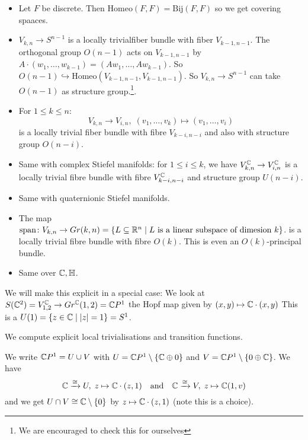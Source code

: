 \documentclass[language=english]{TemplateLecture}
\begin{document}
\begin{example}
    \begin{itemize}
        \item Let \(F\) be discrete. Then \(\mathrm{Homeo}(F,F) = \mathrm{Bij}(F,F)\) so we get covering spaaces.
        \item \(V_{k,n} \to S^{n-1}\) is a locally trivialfiber bundle with fiber \(V_{k-1,n-1}\). The orthogonal group \(O(n-1)\) acts on \(V_{k-1, n-1}\) by \(A \cdot (w_1, \dots, w_{k-1}) = (A w_1, \dots, Aw_{k-1})\). So \(O(n-1) \hookrightarrow \mathrm{Homeo}(V_{k-1,n-1}, V_{k-1, n-1})\). So \(V_{k,n} \to S^{n-1}\) can take \(O(n-1)\) as structure group.\footnote{We are encouraged to check this for ourselves}.
        \item For \(1 \leq k \leq n\):
        \[V_{k,n} \to V_{i,n}, \; (v_1, \dots, v_k) \mapsto (v_1, \dots , v_i)\]
        is a locally trivial fiber bundle with fibre \(V_{k-i, n-i}\) and also with structure group \(O(n-i)\).
        \item Same with complex Stiefel manifolds: for \(1 \leq i \leq k\), we have \(V_{k,n}^{\mathbb{C}} \to V_{i,n}^{\mathbb{C}}\) is a locally trivial fibre bundle with fibre \(V_{k-i, n-i}^{\mathbb{C}}\) and structure group \(U(n-i)\).
        \item Same with quaternionic Stiefel manifolds.
        \item The map \(\mathrm{span}\colon V_{k,n} \to Gr(k,n) = \{L\subseteq \mathbb{R}^n \mid L \text{ is a linear subspace of dimesion }k\}\). is a locally trivial fibre bundle with fibre \(O(k)\). This is even an \(O(k)\)-principal bundle.
        \item Same over \(\mathbb{C}, \mathbb{H}\).
    \end{itemize}
\end{example}

We will make this explicit in a special case: We look at \(S(\mathbb{C}^2) = V_{1,2}^{\mathbb{C}} \to Gr^{\mathbb{C}}(1,2) = \mathbb{C} P^1\) the Hopf map given by \((x,y) \mapsto \mathbb{C}\cdot(x,y)\)
This is a \(U(1) = \{z \in \mathbb{C} \mid \lvert z\rvert = 1\} = S^1\).

We compute explicit local trivialisations and transition functions.

We write \(\mathbb{C} P^1 = U \cup V\) with \(U = \mathbb{C} P^1 \setminus \{\mathbb{C} \oplus 0\}\) and \(V = \mathbb{C} P^1 \setminus\{0 \oplus \mathbb{C}\}\). We have
\[\mathbb{C} \xrightarrow{\cong} U, \; z \mapsto \mathbb{C} \cdot (z, 1)\quad \text{and}\quad \mathbb{C} \xrightarrow{\cong} V, \; z \mapsto \mathbb{C}(1,v)\]
and we get \(U \cap V \cong \mathbb{C} \setminus \{0\}\) by \(z \mapsto \mathbb{C} \cdot (z,1)\) (note this is a choice).
\end{document}
